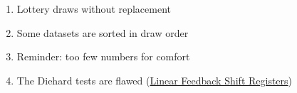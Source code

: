 \begin{enumerate}
    \item Lottery draws without replacement
    \item Some datasets are sorted in draw order
    \item Reminder: too few numbers for comfort
    \item The Diehard tests are flawed (\href{https://crypto.stackexchange.com/a/397}{Linear Feedback Shift Registers})
\end{enumerate}